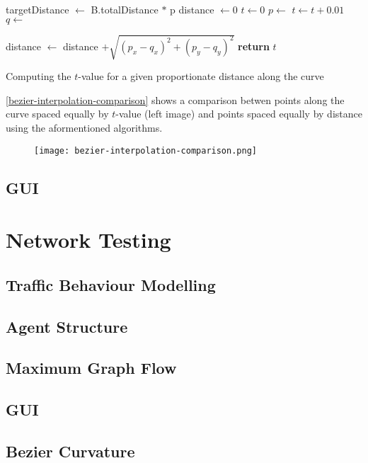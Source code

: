     \begin{algorithm}
        \begin{algorithmic}
                \State targetDistance $\gets$ B.totalDistance $*$ p
                \State distance $\gets 0$
                \State $t \gets 0$
                    \State $p \gets$ 
                    \State $t \gets t + 0.01$
                    \State $q \gets$ 

                    \State distance $\gets$ distance $+ \sqrt{(p_x - q_x)^2 + (p_y - q_y)^2}$
                \EndWhile
                \State \textbf{return} $t$
            \EndFunction
        \end{algorithmic}
        \caption{Computing the $t$-value for a given proportionate distance along the curve}
        \label{proportionate-distance-algorithm}
    \end{algorithm}

    \autoref{bezier-interpolation-comparison} shows a comparison betwen points along the curve spaced equally by $t$-value (left image) and points spaced equally by distance using the aformentioned algorithms.

    \begin{figure}
        \centering
        \texttt{[image: bezier-interpolation-comparison.png]}
        \caption{}
        \label{bezier-interpolation-comparison}
    \end{figure}

    \subsection{GUI}

\section{Network Testing}

    \subsection{Traffic Behaviour Modelling}

    \subsection{Agent Structure}

    \subsection{Maximum Graph Flow}

    \subsection{GUI}

    \subsection{Bezier Curvature}
